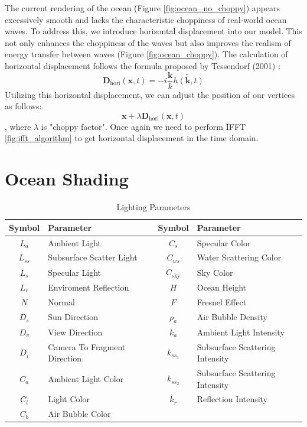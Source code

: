 The current rendering of the ocean (Figure \ref{fig:ocean_no_choppy}) appears excessively smooth and lacks the characteristic choppiness of real-world ocean waves. To address this, we introduce horizontal displacement into our model. This not only enhances the choppiness of the waves but also improves the realism of energy transfer between waves (Figure \ref{fig:ocean_choppy}).
The calculation of horizontal displacement follows the formula proposed by Tessendorf (2001) \cite{tessendorf2001}:
\begin{equation}
    \mathbf{D}_{\text{hori}}(\textbf{x}, t) = -i\frac{\mathbf{k}}{k}\tilde{h(\mathbf{k}, t)}
\end{equation}
Utilizing this horizontal displacement, we can adjust the position of our vertices as follows:
\begin{equation}
    \mathbf{x} + \lambda \mathbf{D}_{\text{hori}}(\textbf{x}, t)
\end{equation}
, where $\lambda$ is "choppy factor".
Once again we need to perform IFFT \ref{fig:ifft_algorithm} to get horizontal displacement in the time domain.

\section{Ocean Shading}

\begin{table}[H]
    \centering
    \begin{tabular}{cl|cl}
        \toprule
        \textbf{Symbol} & \textbf{Parameter} & \textbf{Symbol} & \textbf{Parameter} \\
        \midrule
        $L_a$ & Ambient Light & $C_{s}$ & Specular Color \\
        $L_{ss}$ & Subsurface Scatter Light & $C_{ws}$ & Water Scattering Color \\
        $L_s$ & Specular Light & $C_{\text{sky}}$ & Sky Color \\
        $L_r$ & Enviroment Reflection & $H$ & Ocean Height \\
        $N$ & Normal & $F$ & Fresnel Effect \\
        $D_s$ & Sun Direction & $\rho_a$ & Air Bubble Density \\
        $D_v$ & View Direction & $k_a$ & Ambient Light Intensity \\
        $D_i$ & Camera To Fragment Direction & $k_{ss_1}$ & Subsurface Scattering Intensity \\
        $C_a$ & Ambient Light Color & $k_{ss_2}$ & Subsurface Scattering Intensity \\
        $C_l$ & Light Color & $k_{r}$ & Reflection Intensity \\
        $C_b$ & Air Bubble Color & & \\
        \bottomrule
    \end{tabular}
    \caption{Lighting Parameters}
    \label{table:lighting_parameters}
\end{table}

